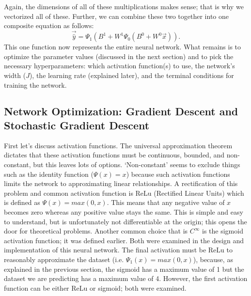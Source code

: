 \documentclass[reqno,14pt]{amsart}
\theoremstyle{plain}
\theoremstyle{definition}
\theoremstyle{remark}
\begin{document}
Again, the dimensions of all of these multiplications makes sense; that is why we vectorized all of these. Further, we can combine these two together into one composite equation as follows:
\begin{equation}
    \overrightarrow{\hat{y}} = \Psi_1( B^1 + W^1 \Psi_0( B^0 + W^0 \overrightarrow{x} ) ).
\end{equation}
This one function now represents the entire neural network. What remains is to optimize the parameter values (discussed in the next section) and to pick the necessary hyperparameters: which activation function(s) to use, the network's width ($J$), the learning rate (explained later), and the terminal conditions for training the network.\\

\subsection{Network Optimization: Gradient Descent and Stochastic Gradient Descent}
First let's discuss activation functions. The universal approximation theorem dictates that these activation functions must be continuous, bounded, and non-constant, but this leaves lots of options. `Non-constant' seems to exclude things such as the identity function ($\Psi(x) = x$) because such activation functions limits the network to approximating linear relationships. A rectification of this problem and common activation function is ReLu (Rectified Linear Units) which is defined as $\Psi(x) = max(0,x)$. This means that any negative value of $x$ becomes zero whereas any positive value stays the same. This is simple and easy to understand, but is unfortunately not differentiable at the origin; this opens the door for theoretical problems. Another common choice that is $C^\infty$ is the sigmoid activation function; it was defined earlier. Both were examined in the design and implementation of this neural network. The final activation must be ReLu to reasonably approximate the dataset (i.e. $\Psi_1(x) = max(0,x)$), because, as explained in the previous section, the sigmoid has a maximum value of 1 but the dataset we are predicting has a maximum value of 4. However, the first activation function can be either ReLu or sigmoid; both were examined.\\
\end{document}
